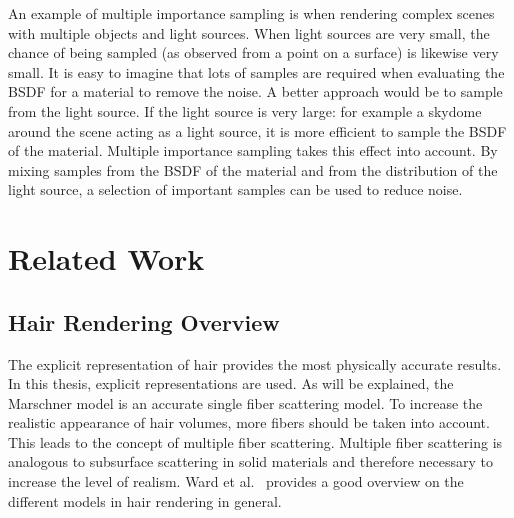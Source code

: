 \documentclass[11pt,a4paper]{report}
\begin{document}
An example of multiple importance sampling is when rendering complex scenes with multiple objects and light sources. When light sources are very small, the chance of being sampled (as observed from a point on a surface) is likewise very small. It is easy to imagine that lots of samples are required when evaluating the BSDF for a material to remove the noise. A better approach would be to sample from the light source. If the light source is very large: for example a skydome around the scene acting as a light source, it is more efficient to sample the BSDF of the material. Multiple importance sampling takes this effect into account. By mixing samples from the BSDF of the material and from the distribution of the light source, a selection of important samples can be used to reduce noise. 





\chapter{Related Work}






\section{Hair Rendering Overview}

The explicit representation of hair provides the most physically accurate results. In this thesis, explicit representations are used. As will be explained, the Marschner model is an accurate single fiber scattering model. To increase the realistic appearance of hair volumes, more fibers should be taken into account. This leads to the concept of multiple fiber scattering. Multiple fiber scattering is analogous to subsurface scattering in solid materials and therefore necessary to increase the level of realism. Ward et al.~\cite{ward} provides a good overview on the different models in hair rendering in general.
\end{document}
